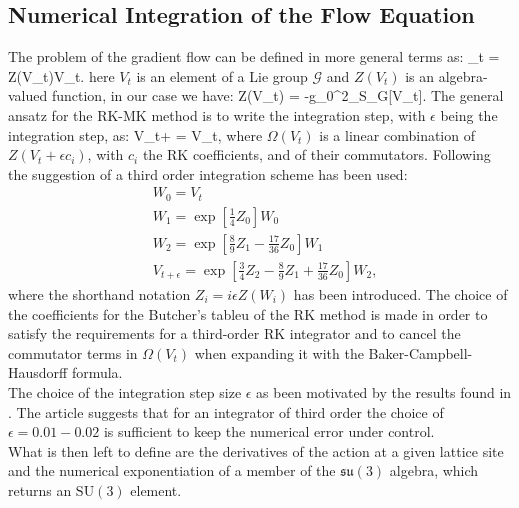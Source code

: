 \subsection{Numerical Integration of the Flow Equation}
The problem of the gradient flow can be defined in more general terms as:
\beq
    _t =  Z(V_t)V_t.
\eeq
here $V_t$ is an element of a Lie group $\mathcal{G}$ and $Z(V_t)$ is an algebra-valued function, in our case we have:
\beq 
Z(V_t) = -g_0^2\partial_\mu S_G[V_t].
\label{eq:flow_action}
\eeq
The general ansatz for the RK-MK method is to write the integration step, with $\epsilon$ being the integration step, as:
\beq
    V_{t+\epsilon} =   V_t,
\eeq
where $\Omega(V_t)$ is a linear combination of $Z(V_t + \epsilon c_i)$, with $c_i$ the RK coefficients, and of their commutators. Following the suggestion of \cite{luscher_properties_2010} a third order integration scheme  has been used:
\begin{align}
    \label{eq:integrator}
    &W_0 = V_t\\\nonumber
    &W_1 = \exp\left[ \frac{1}{4}Z_0 \right] W_0 \\\nonumber
    &W_2 = \exp\left[ \frac{8}{9}Z_1 - \frac{17}{36}Z_0 \right] W_1\\\nonumber
    &V_{t+\epsilon} = \exp\left[ \frac{3}{4}Z_2 - \frac{8}{9}Z_1 + \frac{17}{36}Z_0\right] W_2,
\end{align}
where the shorthand notation $Z_i = i\epsilon Z(W_i)$ has been introduced. The choice of the coefficients for the Butcher's tableu \cite{_numerical_????} of the RK method is made in order to satisfy the requirements for a third-order RK integrator and to cancel the commutator terms in $\Omega(V_t)$ when expanding it with the Baker-Campbell-Hausdorff formula. \\
The choice of the integration step size $\epsilon$ as been motivated by the results found in \cite{ce_testing_2015}. The article suggests that for an integrator of third order the choice of $\epsilon=0.01-0.02$ is sufficient to keep the numerical error under control.\\
What is then left to define are the derivatives of the action at a given lattice site and the numerical exponentiation of a member of the $\mathfrak{su}(3)$ algebra, which returns an $\mathrm{SU}(3)$ element.

